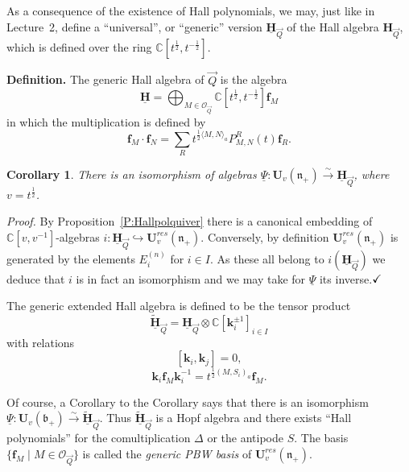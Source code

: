 \documentclass[a4paper,10pt]{amsart}
\def\H{\mathbf{H}}
\def\U{\mathbf{U}}
\def\qed{$\hfill \checkmark$}
\def\C{\mathbb{C}}
\def\bo{\mathfrak{b}}
\def\n{\mathfrak{n}}
\newtheorem{cor}[theo]{Corollary}
\numberwithin{equation}{section}
\begin{document}
\vspace{.15in}

As a consequence of the existence of Hall polynomials, we may, just like in Lecture~2, define a
 ``universal'', or ``generic'' version $\underline{\H}_{\vec{Q}}$ of the Hall algebra $\H_{\vec{Q}}$, which is defined over the ring $\C[t^{\frac{1}{2}},t^{-\frac{1}{2}}]$.

\vspace{.1in}

\noindent
\textbf{Definition.} The generic Hall algebra of $\vec{Q}$ is the algebra
$$\underline{\H}=\bigoplus_{M \in \mathcal{O}_{\vec{Q}}} \C[t^{\frac{1}{2}},t^{-\frac{1}{2}}] \mathbf{f}_{M}$$ in which the multiplication is defined by
$$\mathbf{f}_M \cdot \mathbf{f}_{N}=\sum_{R} t^{\frac{1}{2}\langle M,N \rangle_a}P^{R}_{M,N}(t) \mathbf{f}_R.$$

\vspace{.1in}

\begin{cor} There is an isomorphism of algebras $\underline{\Psi}: \U_{v}(\n_+) \stackrel{\sim}{\to} \underline{\H}_{\vec{Q}}$, where $v=t^{\frac{1}{2}}$.
\end{cor}

\noindent
\textit{Proof.} By Proposition~\ref{P:Hallpolquiver} there is a canonical embedding of $\C[v,v^{-1}]$-algebras $i:\underline{\H}_{\vec{Q}} \hookrightarrow \U_v^{res}(\n_+)$. Conversely, by definition $\U_v^{res}(\n_+)$ is generated by the elements $E_i^{(n)}$ for $i \in I$. As these all belong to $i(\underline{\H}_{\vec{Q}})$ we deduce that $i$ is in fact an isomorphism and we may take for $\underline{\Psi}$ its inverse.\qed

\vspace{.1in}

The generic extended Hall algebra is defined to be the tensor product $$\widetilde{\underline{\H}}_{\vec{Q}}=\underline{\H}_{\vec{Q}} \otimes \C[\mathbf{k}^{\pm 1}_i]_{i \in I}$$
with relations
$$[\mathbf{k}_i,\mathbf{k}_j]=0,$$
$$\mathbf{k}_i \mathbf{f}_M \mathbf{k}_i^{-1}=t^{\frac{1}{2}(M,S_i)_a}\mathbf{f}_M.$$

Of course, a Corollary to the Corollary says that there is an isomorphism $\underline{\Psi}: \U_v(\bo_+) \stackrel{\sim}{\to} \underline{\widetilde{\H}}_{\vec{Q}}$. Thus $\underline{\widetilde{\H}}_{\vec{Q}}$ is a Hopf algebra and there exists ``Hall polynomials'' for the comultiplication $\Delta$ or the antipode $S$. The basis $\{\mathbf{f}_{M}\;|\; M \in \mathcal{O}_{\vec{Q}}\}$ is called the \textit{generic PBW basis} of $\U_v^{res}(\n_+)$.
\end{document}
